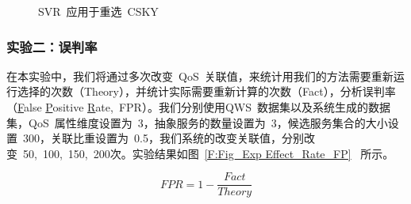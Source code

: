 \begin{figure}[!thb]
 \begin{minipage}[b]{1\linewidth} %
    \centering
    \hspace{0.05in}
    \caption{SVR~应用于重选~CSKY}
    \label{F:Fig_Exp Effect_CSKY}
  \end{minipage}%
\end{figure}


\subsubsection{实验二：误判率}

在本实验中，我们将通过多次改变~QoS~关联值，来统计用我们的方法需要重新运行选择的次数（Theory），并统计实际需要重新计算的次数（Fact），分析误判率（\underline{F}alse \underline{P}ositive \underline{R}ate,~FPR）。我们分别使用QWS~数据集以及系统生成的数据集，QoS~属性维度设置为~3，抽象服务的数量设置为~3，候选服务集合的大小设置~300，关联比重设置为~0.5，我们系统的改变关联值，分别改变~50,~100,~150,~200次。实验结果如图~\ref{F:Fig_Exp Effect_Rate_FP}~ 所示。

\begin{equation}
FPR = 1 - \frac{Fact}{Theory}
\label{E:EQ_FPR}
\end{equation}

